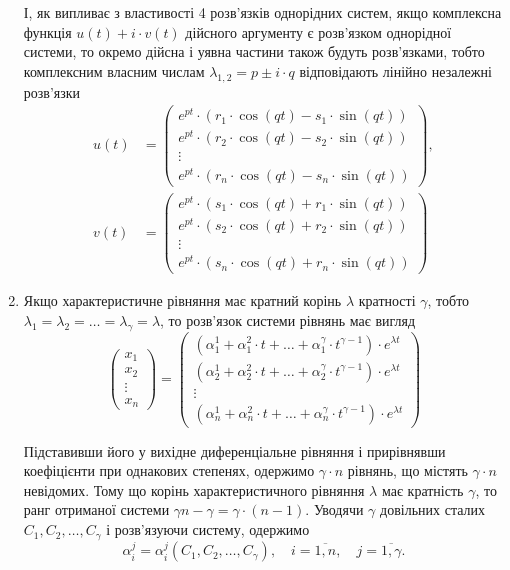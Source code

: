 \begin{enumerate}
І, як випливає з властивості 4 розв'язків однорідних систем, якщо комплексна функція $u(t) + i \cdot v(t)$ дійсного аргументу є розв'язком однорідної системи, то окремо дійсна і уявна частини також будуть розв'язками, тобто комплексним власним числам $\lambda_{1,2} = p \pm i \cdot q$  відповідають лінійно незалежні розв'язки
\begin{align*}
	u(t) &= \begin{pmatrix} e^{p t} \cdot (r_1 \cdot \cos (qt) - s_1 \cdot \sin(qt)) \\ e^{pt} \cdot (r_2 \cdot \cos (qt) - s_2 \cdot \sin(qt)) \\ \vdots \\ e^{pt} \cdot (r_n \cdot \cos (qt) - s_n \cdot \sin(qt)) \end{pmatrix}, \\
	v(t) &= \begin{pmatrix} e^{p t} \cdot (s_1 \cdot \cos (qt) + r_1 \cdot \sin(qt)) \\ e^{pt} \cdot (s_2 \cdot \cos (qt) + r_2 \cdot \sin(qt)) \\ \vdots \\ e^{pt} \cdot (s_n \cdot \cos (qt) + r_n \cdot \sin(qt)) \end{pmatrix}
\end{align*}

\item Якщо характеристичне рівняння має кратний корінь $\lambda$ кратності $\gamma$, тобто $\lambda_1 = \lambda_2 = \ldots = \lambda_\gamma = \lambda$, то розв'язок системи рівнянь має вигляд
\begin{equation*}
	\begin{pmatrix} x_1 \\ x_2 \\ \vdots \\ x_n \end{pmatrix} = \begin{pmatrix} \left(\alpha_1^1 + \alpha_1^2 \cdot t + \ldots + \alpha_1^\gamma \cdot t^{\gamma - 1}\right) \cdot e^{\lambda t} \\ \left(\alpha_2^1 + \alpha_2^2 \cdot t + \ldots + \alpha_2^\gamma \cdot t^{\gamma - 1}\right) \cdot e^{\lambda t} \\ \vdots \\ \left(\alpha_n^1 + \alpha_n^2 \cdot t + \ldots + \alpha_n^\gamma \cdot t^{\gamma - 1}\right) \cdot e^{\lambda t} \end{pmatrix}
\end{equation*}

Підставивши його у вихідне диференціальне рівняння і прирівнявши коефіцієнти при однакових степенях, одержимо $\gamma \cdot n$ рівнянь, що містять $\gamma \cdot n$ невідомих. Тому що корінь характеристичного рівняння $\lambda$ має кратність $\gamma$, то ранг отриманої системи $\gamma n - \gamma = \gamma \cdot (n - 1)$. Уводячи $\gamma$ довільних сталих $C_1, C_2, \ldots, C_\gamma$ і розв'язуючи систему, одержимо
\begin{equation*}
	\alpha_i^j = \alpha_i^j(C_1, C_2, \ldots, C_\gamma), \quad i = \overline{1, n}, \quad j = \overline{1, \gamma}.
\end{equation*}
\end{enumerate}